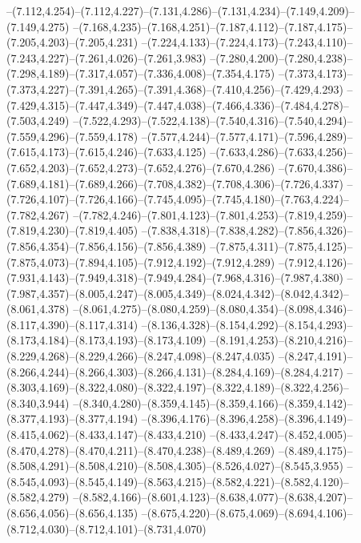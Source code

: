   --(7.112,4.254)--(7.112,4.227)--(7.131,4.286)--(7.131,4.234)--(7.149,4.209)--(7.149,4.275)%
  --(7.168,4.235)--(7.168,4.251)--(7.187,4.112)--(7.187,4.175)--(7.205,4.203)--(7.205,4.231)%
  --(7.224,4.133)--(7.224,4.173)--(7.243,4.110)--(7.243,4.227)--(7.261,4.026)--(7.261,3.983)%
  --(7.280,4.200)--(7.280,4.238)--(7.298,4.189)--(7.317,4.057)--(7.336,4.008)--(7.354,4.175)%
  --(7.373,4.173)--(7.373,4.227)--(7.391,4.265)--(7.391,4.368)--(7.410,4.256)--(7.429,4.293)%
  --(7.429,4.315)--(7.447,4.349)--(7.447,4.038)--(7.466,4.336)--(7.484,4.278)--(7.503,4.249)%
  --(7.522,4.293)--(7.522,4.138)--(7.540,4.316)--(7.540,4.294)--(7.559,4.296)--(7.559,4.178)%
  --(7.577,4.244)--(7.577,4.171)--(7.596,4.289)--(7.615,4.173)--(7.615,4.246)--(7.633,4.125)%
  --(7.633,4.286)--(7.633,4.256)--(7.652,4.203)--(7.652,4.273)--(7.652,4.276)--(7.670,4.286)%
  --(7.670,4.386)--(7.689,4.181)--(7.689,4.266)--(7.708,4.382)--(7.708,4.306)--(7.726,4.337)%
  --(7.726,4.107)--(7.726,4.166)--(7.745,4.095)--(7.745,4.180)--(7.763,4.224)--(7.782,4.267)%
  --(7.782,4.246)--(7.801,4.123)--(7.801,4.253)--(7.819,4.259)--(7.819,4.230)--(7.819,4.405)%
  --(7.838,4.318)--(7.838,4.282)--(7.856,4.326)--(7.856,4.354)--(7.856,4.156)--(7.856,4.389)%
  --(7.875,4.311)--(7.875,4.125)--(7.875,4.073)--(7.894,4.105)--(7.912,4.192)--(7.912,4.289)%
  --(7.912,4.126)--(7.931,4.143)--(7.949,4.318)--(7.949,4.284)--(7.968,4.316)--(7.987,4.380)%
  --(7.987,4.357)--(8.005,4.247)--(8.005,4.349)--(8.024,4.342)--(8.042,4.342)--(8.061,4.378)%
  --(8.061,4.275)--(8.080,4.259)--(8.080,4.354)--(8.098,4.346)--(8.117,4.390)--(8.117,4.314)%
  --(8.136,4.328)--(8.154,4.292)--(8.154,4.293)--(8.173,4.184)--(8.173,4.193)--(8.173,4.109)%
  --(8.191,4.253)--(8.210,4.216)--(8.229,4.268)--(8.229,4.266)--(8.247,4.098)--(8.247,4.035)%
  --(8.247,4.191)--(8.266,4.244)--(8.266,4.303)--(8.266,4.131)--(8.284,4.169)--(8.284,4.217)%
  --(8.303,4.169)--(8.322,4.080)--(8.322,4.197)--(8.322,4.189)--(8.322,4.256)--(8.340,3.944)%
  --(8.340,4.280)--(8.359,4.145)--(8.359,4.166)--(8.359,4.142)--(8.377,4.193)--(8.377,4.194)%
  --(8.396,4.176)--(8.396,4.258)--(8.396,4.149)--(8.415,4.062)--(8.433,4.147)--(8.433,4.210)%
  --(8.433,4.247)--(8.452,4.005)--(8.470,4.278)--(8.470,4.211)--(8.470,4.238)--(8.489,4.269)%
  --(8.489,4.175)--(8.508,4.291)--(8.508,4.210)--(8.508,4.305)--(8.526,4.027)--(8.545,3.955)%
  --(8.545,4.093)--(8.545,4.149)--(8.563,4.215)--(8.582,4.221)--(8.582,4.120)--(8.582,4.279)%
  --(8.582,4.166)--(8.601,4.123)--(8.638,4.077)--(8.638,4.207)--(8.656,4.056)--(8.656,4.135)%
  --(8.675,4.220)--(8.675,4.069)--(8.694,4.106)--(8.712,4.030)--(8.712,4.101)--(8.731,4.070)%
